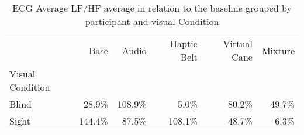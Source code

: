 
\begin{table}[!htb]
\centering
\caption{ECG Average LF/HF average in relation to the baseline grouped by participant and visual Condition}
\label{tab:ecg_lfhf_average_group}
\begin{tabular}{lrrrrr}
\toprule
{} &     Base &    Audio & Haptic Belt & Virtual Cane & Mixture \\
Visual Condition &          &          &             &              &         \\
\midrule
Blind            &   28.9\% &  108.9\% &       5.0\% &       80.2\% &  49.7\% \\
Sight            &  144.4\% &   87.5\% &     108.1\% &       48.7\% &   6.3\% \\
\bottomrule
\end{tabular}
\end{table}

